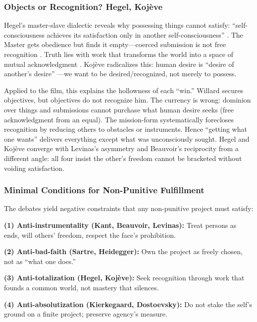 \subsubsection*{Objects or Recognition? Hegel, Kojève}

Hegel's master-slave dialectic reveals why possessing things cannot satisfy:
``self-consciousness achieves its satisfaction only in another self-consciousness''
\parencite[\S 175]{HegelPhenomenology1977}. The Master gets obedience but finds it empty---coerced
submission is not free recognition \parencite[\S\S 187--189]{HegelPhenomenology1977}. Truth
lies with work that transforms the world into a space of mutual acknowledgment
\parencite[\S 196]{HegelPhenomenology1977}. Koj{\`e}ve radicalizes this: human desire is
``desire of another's desire'' \parencite[p.~6]{KojeveIRH1980}---we want to be desired/recognized,
not merely to possess.

Applied to the film, this explains the hollowness of each ``win.'' Willard secures objectives,
but objectives do not recognize him. The currency is wrong: dominion over things and
submissions cannot purchase what human desire seeks (free acknowledgment from an equal). The
mission-form systematically forecloses recognition by reducing others to obstacles or
instruments. Hence ``getting what one wants'' delivers everything except what was unconsciously
sought. Hegel and Koj{\`e}ve converge with Levinas's asymmetry and Beauvoir's reciprocity from
a different angle: all four insist the other's freedom cannot be bracketed without voiding
satisfaction.

\subsubsection*{Minimal Conditions for Non-Punitive Fulfillment}

The debates yield negative constraints that any non-punitive project must satisfy:

\textbf{(1) Anti-instrumentality (Kant, Beauvoir, Levinas):} Treat persons as ends, will
others' freedom, respect the face's prohibition.

\textbf{(2) Anti-bad-faith (Sartre, Heidegger):} Own the project as freely chosen, not as
``what one does.''

\textbf{(3) Anti-totalization (Hegel, Kojève):} Seek recognition through work that founds a
common world, not mastery that silences.

\textbf{(4) Anti-absolutization (Kierkegaard, Dostoevsky):} Do not stake the self's ground on
a finite project; preserve agency's measure.

